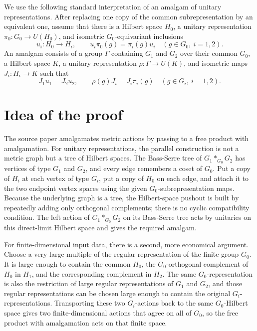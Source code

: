 \documentclass[11pt]{article}
\begin{document}
We use the following standard interpretation of an amalgam of unitary
representations.  After replacing one copy of the common subrepresentation by
an equivalent one, assume that there is a Hilbert space \(H_0\), a unitary
representation \(\pi_0\colon G_0\to U(H_0)\), and isometric \(G_0\)-equivariant
inclusions
\[
u_i\colon H_0\longrightarrow H_i,\qquad
u_i\pi_0(g)=\pi_i(g)u_i\quad(g\in G_0,\ i=1,2).
\]
An amalgam consists of a group \(\Gamma\) containing \(G_1\) and \(G_2\) over
their common \(G_0\), a Hilbert space \(K\), a unitary representation
\(\rho\colon \Gamma\to U(K)\), and isometric maps \(J_i\colon H_i\to K\) such
that
\[
J_1u_1=J_2u_2,\qquad
\rho(g)J_i=J_i\pi_i(g)\quad(g\in G_i,\ i=1,2).
\]

\section*{Idea of the proof}

The source paper amalgamates metric actions by passing to a free product with
amalgamation.  For unitary representations, the parallel construction is not
a metric graph but a tree of Hilbert spaces.  The Bass-Serre tree of
\(G_1*_{G_0}G_2\) has vertices of type \(G_1\) and \(G_2\), and every edge
remembers a coset of \(G_0\).  Put a copy of \(H_i\) at each vertex of type
\(G_i\), put a copy of \(H_0\) on each edge, and attach it to the two endpoint
vertex spaces using the given \(G_0\)-subrepresentation maps.  Because the
underlying graph is a tree, the Hilbert-space pushout is built by repeatedly
adding only orthogonal complements; there is no cyclic compatibility condition.
The left action of \(G_1*_{G_0}G_2\) on its Bass-Serre tree acts by unitaries
on this direct-limit Hilbert space and gives the required amalgam.

For finite-dimensional input data, there is a second, more economical
argument.  Choose a very large multiple of the regular representation of the
finite group \(G_0\).  It is large enough to contain the common \(H_0\), the
\(G_0\)-orthogonal complement of \(H_0\) in \(H_1\), and the corresponding
complement in \(H_2\).  The same \(G_0\)-representation is also the restriction
of large regular representations of \(G_1\) and \(G_2\), and those regular
representations can be chosen large enough to contain the original
\(G_i\)-representations.  Transporting these two \(G_i\)-actions back to the
same \(G_0\)-Hilbert space gives two finite-dimensional actions that agree on
all of \(G_0\), so the free product with amalgamation acts on that finite
space.
\end{document}
